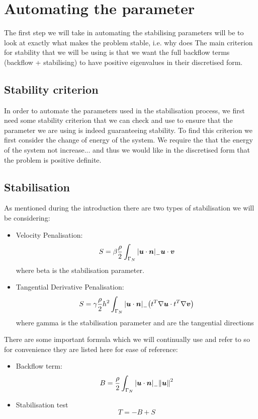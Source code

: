 \chapter{Automating the parameter} %


The first step we will take in automating the stabilising parameters will be to look at exactly what makes the problem stable, i.e. why does The main criterion for stability that we will be using is that we want the full backflow terms (backflow + stabilising) to have positive eigenvalues in their discretised form. 

\section{Stability criterion}

In order to automate the parameters used in the stabilisation process, we first need some stability criterion that we can check and use to ensure that the parameter we are using is indeed guaranteeing stability. To find this criterion we first consider the change of energy of the system. We require the that the energy of the system not increase... and thus we would like in the discretised form that the problem is positive definite.

\section{Stabilisation}

As mentioned during the introduction there are two types of stabilisation we will be considering:
\begin{itemize}
    \item Velocity Penalisation:
    \[
    S = \beta\frac{\rho}{2}\int_{\Gamma_N} \abs{\bm{u} \cdot \bm{n} }_- \bm{u} \cdot \bm{v}
    \]
    where beta is the stabilisation parameter.
    \item Tangential Derivative Penalisation:
    \[
    S = \gamma\frac{\rho}{2}h^{2}\int_{\Gamma_N} \abs{\bm{u} \cdot \bm{n} }_- \qty(t^{T}\nabla\bm{u} \cdot t^{T}\nabla\bm{v})
    \]
    where gamma is the stabilisation parameter and  are the tangential directions
\end{itemize}

There are some important formula which we will continually use and refer to so for convenience they are listed here for ease of reference:
\begin{itemize}
    \item Backflow term:\\
    \[
    B = \frac{\rho}{2}\int_{\Gamma_N} \abs{\bm{u} \cdot \bm{n} }_- \norm{\bm{u}}^2
    \]
    \item Stabilisation test
    \[
    T = -B + S
    \]
\end{itemize}


